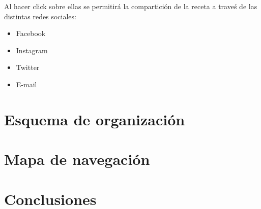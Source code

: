 \documentclass{\ClassPath/viu-tfm-template}
\begin{document}
Al hacer click sobre ellas se permitirá la compartición de la receta a traveś de las distintas redes sociales:

\begin{itemize}
    \item Facebook
    \item Instagram
    \item Twitter
    \item E-mail
\end{itemize}




\chapter{Esquema de organización}





\chapter{Mapa de navegación}





\chapter{Conclusiones}




\end{document}
